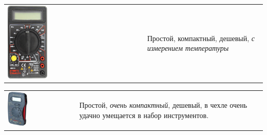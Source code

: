\secdown
{}\label{mmetr838}

\begin{tabular}{p{} p{}}
\noindent\includegraphics[width=0.3\textwidth]{tech/tools/mes/M838.jpg}
&
Простой, компактный, дешевый, \emph{с измерением температуры}
\\
\end{tabular}

\label{mmetr300}

\begin{tabular}{p{} p{}}
\noindent\includegraphics[width=0.3\textwidth]{tech/tools/mes/M300.jpg}
&
Простой, \emph{очень компактный}, дешевый, в чехле очень удачно умещается в
набор инструментов.
\\
\end{tabular}

\label{mmetr320}

